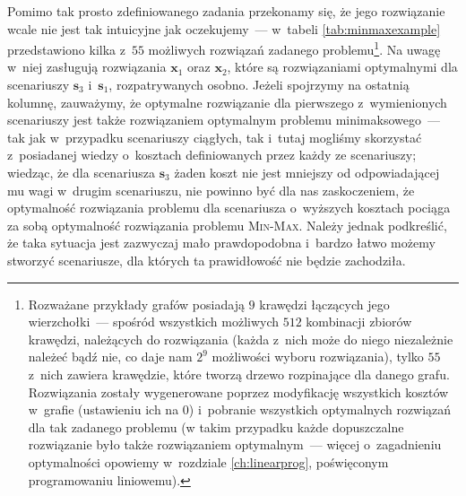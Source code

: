 Pomimo tak prosto zdefiniowanego zadania przekonamy się, że jego rozwiązanie wcale nie jest tak intuicyjne jak oczekujemy~--- w~tabeli \ref{tab:minmaxexample} przedstawiono kilka z~$55$ możliwych rozwiązań zadanego problemu\footnote{
	Rozważane przykłady grafów posiadają $9$ krawędzi łączących jego wierzchołki~--- spośród wszystkich możliwych $512$ kombinacji zbiorów krawędzi, należących do rozwiązania (każda z~nich może do niego niezależnie należeć bądź nie, co daje nam $2^{9}$ możliwości wyboru rozwiązania), tylko $55$ z~nich zawiera krawędzie, które tworzą drzewo rozpinające dla danego grafu.
	Rozwiązania zostały wygenerowane poprzez modyfikację wszystkich kosztów w~grafie (ustawieniu ich na $0$) i~pobranie wszystkich optymalnych rozwiązań dla tak zadanego problemu (w takim przypadku każde dopuszczalne rozwiązanie było także rozwiązaniem optymalnym~--- więcej o~zagadnieniu optymalności opowiemy w~rozdziale \ref{ch:linearprog}, poświęconym programowaniu liniowemu).}.
Na uwagę w~niej zasługują rozwiązania $\textbf{x}_{1}$ oraz $\textbf{x}_{2}$, które są rozwiązaniami optymalnymi dla scenariuszy $\textbf{s}_{3}$ i~$\textbf{s}_{1}$, rozpatrywanych osobno.
Jeżeli spojrzymy na ostatnią kolumnę, zauważymy, że optymalne rozwiązanie dla pierwszego z~wymienionych scenariuszy jest także rozwiązaniem optymalnym problemu minimaksowego~--- tak jak w~przypadku scenariuszy ciągłych, tak i~tutaj mogliśmy skorzystać z~posiadanej wiedzy o~kosztach definiowanych przez każdy ze scenariuszy; wiedząc, że dla scenariusza $\textbf{s}_{3}$ żaden koszt nie jest mniejszy od odpowiadającej mu wagi w~drugim scenariuszu, nie powinno być dla nas zaskoczeniem, że optymalność rozwiązania problemu dla scenariusza o~wyższych kosztach pociąga za sobą optymalność rozwiązania problemu \textsc{Min-Max}.
Należy jednak podkreślić, że taka sytuacja jest zazwyczaj mało prawdopodobna i~bardzo łatwo możemy stworzyć scenariusze, dla których ta prawidłowość nie będzie zachodziła.

